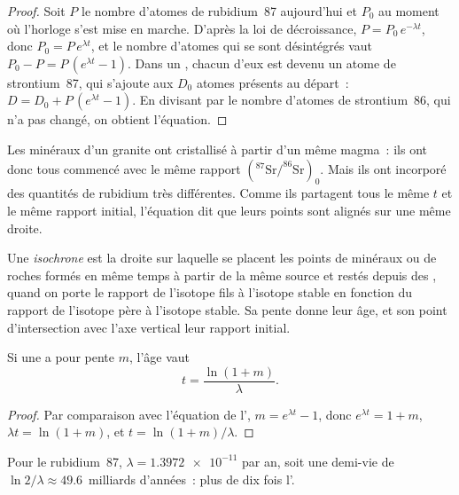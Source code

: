 \begin{proof}
Soit $P$ le nombre d'atomes de rubidium~87 aujourd'hui et $P_0$ au moment où
l'horloge s'est mise en marche. D'après la loi de décroissance,
$P = P_0\,e^{-\lambda t}$, donc $P_0 = P\,e^{\lambda t}$, et le nombre
d'atomes qui se sont désintégrés vaut $P_0 - P = P\,(e^{\lambda t}-1)$.
Dans un , chacun d'eux est devenu un atome de strontium~87, qui
s'ajoute aux $D_0$ atomes présents au départ~: $D = D_0 + P\,(e^{\lambda
t}-1)$. En divisant par le nombre d'atomes de strontium~86, qui n'a pas
changé, on obtient l'équation.
\end{proof}

Les minéraux d'un granite ont cristallisé à partir d'un même magma~: ils
ont donc tous commencé avec le même rapport
$(^{87}\mathrm{Sr}/^{86}\mathrm{Sr})_0$. Mais ils ont incorporé des
quantités de rubidium très différentes. Comme ils partagent tous le même
$t$ et le même rapport initial, l'équation dit que leurs points sont
alignés sur une même droite.

\begin{definition}[Isochrone]\label{def:g12:age-of-the-earth:isochron}
Une \emph{isochrone} est la droite sur laquelle se placent
les points de minéraux ou de roches formés en même temps à partir de la
même source et restés depuis des , quand on porte le rapport
de l'isotope fils à l'isotope stable en fonction du rapport de l'isotope
père à l'isotope stable. Sa pente donne leur âge, et son point
d'intersection avec l'axe vertical leur rapport initial.
\end{definition}

\begin{proposition}\label{prop:g12:age-of-the-earth:slope}
Si une  a pour pente $m$, l'âge vaut
\[
  t = \frac{\ln(1+m)}{\lambda}.
\]
\end{proposition}

\begin{proof}
Par comparaison avec l'équation de l', $m = e^{\lambda t} - 1$,
donc $e^{\lambda t} = 1 + m$, $\lambda t = \ln(1+m)$, et $t = \ln(1+m)/\lambda$.
\end{proof}

Pour le rubidium~87, $\lambda = \num{1.3972e-11}$ par an, soit une demi-vie
de $\ln 2/\lambda \approx 49.6$~milliards d'années~: plus de dix fois l'.

